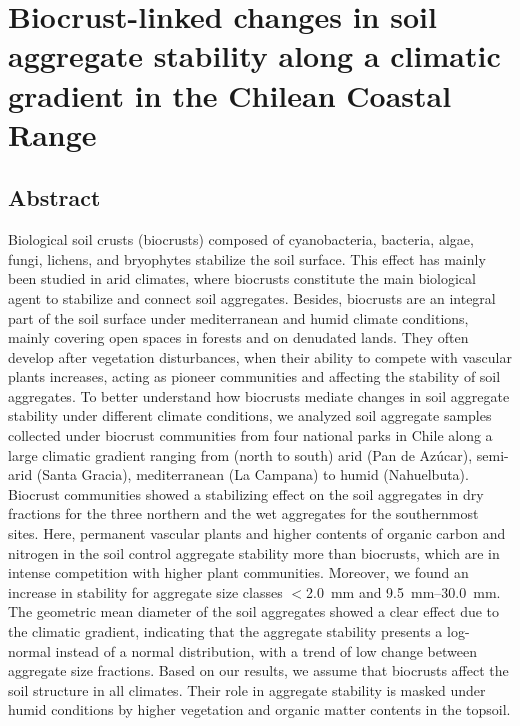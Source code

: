 \usepackage{subcaption} %

\chapter{Biocrust-linked changes in soil aggregate stability along a climatic gradient in the Chilean Coastal Range}
\label{chap:manuscript1} %

\section*{Abstract} %
Biological soil crusts (biocrusts) composed of cyanobacteria, bacteria, algae, fungi, lichens, and bryophytes stabilize the soil surface. This effect has mainly been studied in arid climates, where biocrusts constitute the main biological agent to stabilize and connect soil aggregates. Besides, biocrusts are an integral part of the soil surface under mediterranean and humid climate conditions, mainly covering open spaces in forests and on denudated lands. They often develop after vegetation disturbances, when their ability to compete with vascular plants increases, acting as pioneer communities and affecting the stability of soil aggregates. To better understand how biocrusts mediate changes in soil aggregate stability under different climate conditions, we analyzed soil aggregate samples collected under biocrust communities from four national parks in Chile along a large climatic gradient ranging from (north to south) arid (Pan de Azúcar), semi-arid (Santa Gracia), mediterranean (La Campana) to humid (Nahuelbuta). Biocrust communities showed a stabilizing effect on the soil aggregates in dry fractions for the three northern and the wet aggregates for the southernmost sites. Here, permanent vascular plants and higher contents of organic carbon and nitrogen in the soil control aggregate stability more than biocrusts, which are in intense competition with higher plant communities. Moreover, we found an increase in stability for aggregate size classes $<$\SI{2.0}{\milli\meter} and \SIrange[range-phrase=--,range-units=single]{9.5}{30.0}{\milli\meter}. The geometric mean diameter of the soil aggregates showed a clear effect due to the climatic gradient, indicating that the aggregate stability presents a log-normal instead of a normal distribution, with a trend of low change between aggregate size fractions. Based on our results, we assume that biocrusts affect the soil structure in all climates. Their role in aggregate stability is masked under humid conditions by higher vegetation and organic matter contents in the topsoil.


